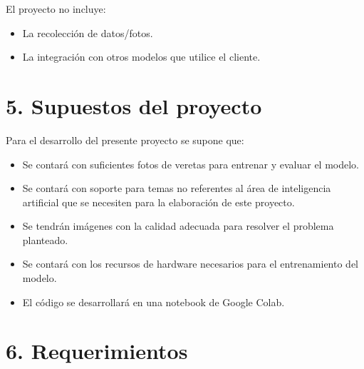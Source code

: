 \documentclass[
11pt, %
codirector, %
]{charter}
\begin{document}
El proyecto no incluye:
\begin{itemize}
	\item La recolección de datos/fotos.
	\item La integración con otros modelos que utilice el cliente.
\end{itemize}

\section{5. Supuestos del proyecto}
\label{sec:supuestos}
Para el desarrollo del presente proyecto se supone que:
\begin{itemize}
	\item Se contará con suficientes fotos de veretas para entrenar y evaluar el modelo. 
	\item Se contará con soporte para temas no referentes al área de inteligencia artificial que se necesiten para la elaboración de este proyecto.
	\item Se tendrán imágenes con la calidad adecuada para resolver el problema planteado.
	\item Se contará con los recursos de hardware necesarios para el entrenamiento del modelo.
	\item El código se desarrollará en una notebook de Google Colab.
\end{itemize}

\section{6. Requerimientos}
\label{sec:requerimientos}
\end{document}
